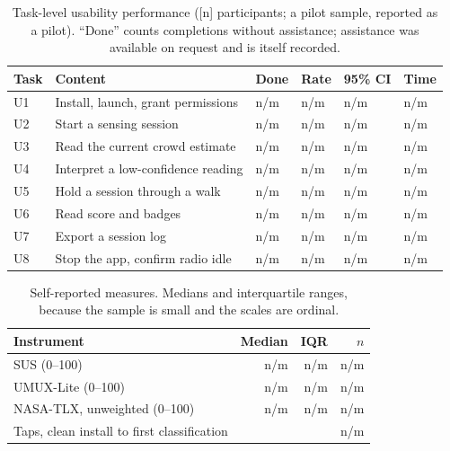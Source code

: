 \begin{table}[t]
\centering
\caption{Task-level usability performance ([n] participants; a pilot sample, reported as a pilot).
``Done'' counts completions without assistance; assistance was available on request and is itself
recorded.}
\label{tab:usability}
\small
\begin{tabular}{llllll}
\toprule
Task & Content & Done & Rate & 95\% CI & Time \\
\midrule
U1 & Install, launch, grant permissions & n/m & n/m & n/m & n/m \\
U2 & Start a sensing session             & n/m & n/m & n/m & n/m \\
U3 & Read the current crowd estimate     & n/m & n/m & n/m & n/m \\
U4 & Interpret a low-confidence reading  & n/m & n/m & n/m & n/m \\
U5 & Hold a session through a walk       & n/m & n/m & n/m & n/m \\
U6 & Read score and badges               & n/m & n/m & n/m & n/m \\
U7 & Export a session log                & n/m & n/m & n/m & n/m \\
U8 & Stop the app, confirm radio idle    & n/m & n/m & n/m & n/m \\
\bottomrule
\end{tabular}
\end{table}

\begin{table}[t]
\centering
\caption{Self-reported measures. Medians and interquartile ranges, because the sample is small and
the scales are ordinal.}
\label{tab:usability-q}
\small
\begin{tabular}{lrrr}
\toprule
Instrument & Median & IQR & $n$ \\
\midrule
SUS (0--100)                          & n/m & n/m & n/m \\
UMUX-Lite (0--100)                    & n/m & n/m & n/m \\
NASA-TLX, unweighted (0--100)         & n/m & n/m & n/m \\
Taps, clean install to first classification & \multicolumn{3}{r}{n/m} \\
\bottomrule
\end{tabular}
\end{table}

